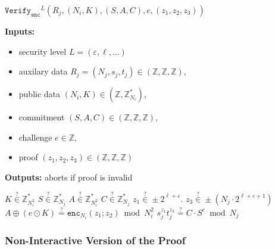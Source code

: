 \documentclass[11pt]{article}
\newenvironment{inlineAlgorithm}{}{}
\newcommand{\algoName}[1]{#1 \par}
\newcommand{\algoInputsList}[1]{
    {\small \bf Inputs:} 
        \begin{itemize}[noitemsep,topsep=0pt]
            #1
        \end{itemize}
}
\newcommand{\algoOutputs}[1]{
    {\small \bf Outputs:} #1 \par
}
\newcommand{\enc}{\ensuremath{\mathtt{enc}}}
\newcommand{\verify}[1]{\ensuremath{\mathtt{Verify}_{\mathtt{#1}}}}
\newcommand{\Z}{\mathbb{Z}}
\newcommand{\?}[1]{\stackrel{?}{#1}}
\begin{document}
\begin{description}
\item
\begin{inlineAlgorithm}
\algoName{$\verify{enc}^L(R_j, (N_i, K), (S, A, C), e, (z_1, z_2, z_3))$}
\algoInputsList{
    \item security level $L = (\varepsilon, \ell, \dots)$
    \item auxilary data $R_j = (N_j, s_j, t_j) \in (\Z, \Z, \Z)$,
    \item public data $(N_i, K) \in (\Z, \Z^*_{N_i})$,
    \item commitment $(S, A, C) \in (\Z, \Z, \Z)$,
    \item challenge $e \in \Z$,
    \item proof $(z_1, z_2, z_3) \in (\Z, \Z, \Z)$
}
\algoOutputs{aborts if proof is invalid}
\begin{algorithmic}[1]
\State $K \? \in \Z^*_{N_i^2}$
\State $S \? \in \Z^*_{N_j}$
\State $A \? \in \Z^*_{N_i^2}$
\State $C \? \in \Z^*_{N_j}$
\State $z_1 \? \in \pm 2^{\ell + \varepsilon}$.
\State $z_3 \? \in \pm (N_j \cdot 2^{\ell + \varepsilon + 1})$
\State $A \oplus (e \odot K) \? = \enc_{N_i}(z_1; z_2) \bmod N_i^2$
\State $s_j^{z_1} t_j^{z_3} \? = C \cdot S^e \bmod N_j$ 
\end{algorithmic}
\end{inlineAlgorithm}

\end{description}

\subsubsection{Non-Interactive Version of the Proof}
\end{document}
